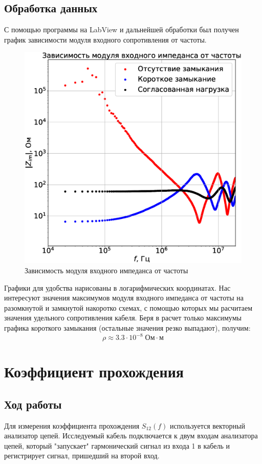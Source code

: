 \documentclass[a4paper,14pt]{extarticle}
\begin{document}
		\subsection{Обработка данных}
			С помощью программы на LabView и дальнейшей обработки был получен график зависимости модуля входного сопротивления от частоты.
			\begin{figure}[h!]
				\centering
				\includegraphics[width=.75\linewidth]{Lab3_1.eps}
				\caption{Зависимость модуля входного импеданса от частоты}
				\label{fig3}
			\end{figure}
			\newpage
			Графики для удобства нарисованы в логарифмических координатах. Нас интересуют значения максимумов модуля входного импеданса от частоты на разомкнутой и замкнутой накоротко схемах, с помощью которых мы расчитаем значения удельного сопротивления кабеля. Беря в расчет только максимумы графика короткого замыкания (остальные значения резко выпадают), получим:
			\begin{equation}
				\rho \approx 3.3 \cdot 10^{-8} \; \text{Ом}\cdot\text{м}
			\end{equation}
	\section{Коэффициент прохождения}
		\subsection{Ход работы}
		Для измерения коэффициента прохождения $S_{1 2}(f)$ используется векторный анализатор цепей. Исследуемый кабель подключается к двум входам анализатора цепей, который "запускает" гармонический сигнал из входа 1 в кабель и регистрирует сигнал, пришедший на второй вход.
		
\end{document}
